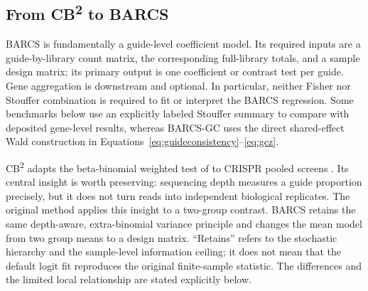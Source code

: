 \subsection{\texorpdfstring{From CB\textsuperscript{2} to
BARCS}{From CB2 to BARCS}}

BARCS is fundamentally a guide-level coefficient model.  Its required inputs
are a guide-by-library count matrix, the corresponding full-library totals,
and a sample design matrix; its primary output is one coefficient or contrast
test per guide.  Gene aggregation is downstream and optional.  In particular,
neither Fisher nor Stouffer combination is required to fit or interpret the
BARCS regression.  Some benchmarks below use an explicitly labeled Stouffer
summary to compare with deposited gene-level results, whereas BARCS-GC uses
the direct shared-effect Wald construction in
Equations~\eqref{eq:guideconsistency}--\eqref{eq:gcz}.

CB\textsuperscript{2} adapts the beta-binomial weighted test of
\citet{baggerly2003differential} to CRISPR pooled screens
\citep{jeong2019beta}.  Its central insight is worth preserving: sequencing
depth measures a guide proportion precisely, but it does not turn reads into
independent biological replicates.  The original method applies this insight
to a two-group contrast.  BARCS retains the same
depth-aware, extra-binomial variance principle and changes the mean model from
two group means to a design matrix.  ``Retains'' refers to the stochastic
hierarchy and the sample-level information ceiling; it does not mean that the
default logit fit reproduces the original finite-sample statistic.  The
differences and the limited local relationship are stated explicitly below.

